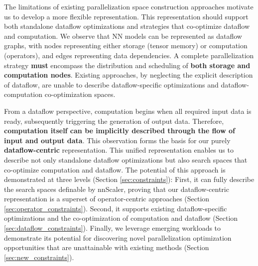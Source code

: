 
The limitations of existing parallelization space construction approaches motivate us to develop a more flexible representation. This representation should support both standalone dataflow optimizations and strategies that co-optimize dataflow and computation. We observe that NN models can be represented as dataflow graphs, with nodes representing either storage (tensor memory) or computation (operators), and edges representing data dependencies. A complete parallelization strategy \textbf{must} encompass the distribution and scheduling of \textbf{both storage and computation nodes}. Existing approaches, by neglecting the explicit description of dataflow, are unable to describe dataflow-specific optimizations and dataflow-computation co-optimization spaces.

From a dataflow perspective, computation begins when all required input data is ready, subsequently triggering the generation of output data. Therefore, \textbf{computation itself can be implicitly described through the flow of input and output data}. This observation forms the basis for our purely \textbf{dataflow-centric} representation. This unified representation enables us to describe not only standalone dataflow optimizations but also search spaces that co-optimize computation and dataflow. The potential of this approach is demonstrated at three levels (Section \ref{sec:constraints}): First, it can fully describe the search spaces definable by nnScaler, proving that our dataflow-centric representation is a superset of operator-centric approaches (Section \ref{sec:operator_constraints}). Second, it supports existing dataflow-specific optimizations and the co-optimization of computation and dataflow (Section \ref{sec:dataflow_constraints}). Finally, we leverage emerging workloads to demonstrate its potential for discovering novel parallelization optimization opportunities that are unattainable with existing methods (Section \ref{sec:new_constraints}).

